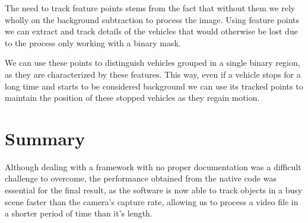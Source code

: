The need to track feature points stems from the fact that without them we rely wholly on the background subtraction to process the image. Using feature points we can extract and track details of the vehicles that would otherwise be lost due to the process only working with a binary mask. 

We can use these points to distinguish vehicles grouped in a single binary region, as they are characterized by these features. This way, even if a vehicle stops for a long time and starts to be considered background we can use its tracked points to maintain the position of these stopped vehicles as they regain motion.




\section{Summary}

Although dealing with a framework with no proper documentation was a difficult challenge to overcome, the performance obtained from the native code was essential for the final result, as the software is now able to track objects in a busy scene faster than the camera's capture rate, allowing us to process a video file in a shorter period of time than it's length.